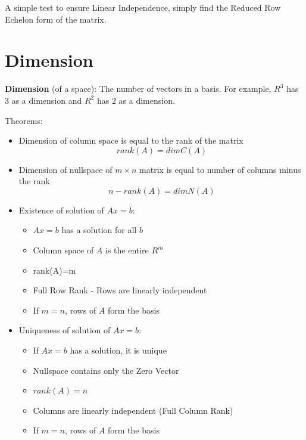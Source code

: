 \documentclass[10pt,a4paper]{article}
\begin{document}
\begin{tcolorbox}[breakable,colback=white]
A simple test to ensure Linear Independence, simply find the Reduced Row Echelon form of the matrix.
\end{tcolorbox}

\section{Dimension}

\begin{tcolorbox}[breakable,colback=white]
\textbf{Dimension} (of a space): The number of vectors in a basis. 
For example, $R^3$ has 3 as a dimension and $R^2$ has 2 as a dimension.
\end{tcolorbox}
Theorems: 
\begin{itemize}
    \item Dimension of column space is equal to the rank of the matrix
    $$rank(A)=dimC(A)$$
    \item Dimension of nullspace of $m\times n$ matrix is equal to number of columns minus the rank
    $$n-rank(A)=dimN(A)$$
    \item Existence of solution of $Ax=b$:
    \begin{itemize}
        \item $Ax=b$ has a solution for all $b$
        \item Column space of $A$ is the entire $R^m$
        \item rank(A)=m
        \item Full Row Rank - Rows are linearly independent
        \item If $m=n$, rows of $A$ form the basis
    \end{itemize}
    \item Uniqueness of solution of $Ax=b$:
    \begin{itemize}
        \item If $Ax=b$ has a solution, it is unique
        \item Nullspace contains only the Zero Vector
        \item $rank(A)=n$
        \item Columns are linearly independent (Full Column Rank)
        \item If $m=n$, rows of $A$ form the basis
    \end{itemize}
\end{itemize}
\pagebreak 
\end{document}
